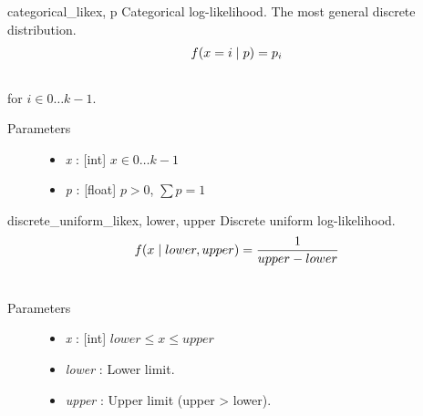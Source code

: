 \hypertarget{pymc.distributions.categorical_like}{}\begin{funcdesc}{categorical\_like}{x, p}
Categorical log-likelihood. The most general discrete distribution.
\begin{gather}
\begin{split}f(x=i \mid p) = p_i\end{split}\notag\\\begin{split}\end{split}\notag
\end{gather}
for $i \in 0 \ldots k-1$.
\begin{description}
\item[Parameters] \leavevmode\begin{itemize}
\item {}
\emph{x} : {[}int{]} $x \in 0\ldots k-1$

\item {}
\emph{p} : {[}float{]} $p > 0$, $\sum p = 1$

\end{itemize}

\end{description}
\end{funcdesc}

\hypertarget{pymc.distributions.discrete_uniform_like}{}\begin{funcdesc}{discrete\_uniform\_like}{x, lower, upper}
Discrete uniform log-likelihood.
\begin{gather}
\begin{split}f(x \mid lower, upper) = \frac{1}{upper-lower}\end{split}\notag\\\begin{split}\end{split}\notag
\end{gather}\begin{description}
\item[Parameters] \leavevmode\begin{itemize}
\item {}
\emph{x} : {[}int{]} $lower \leq x \leq upper$

\item {}
\emph{lower} : Lower limit.

\item {}
\emph{upper} : Upper limit (upper \textgreater{} lower).

\end{itemize}

\end{description}
\end{funcdesc}

